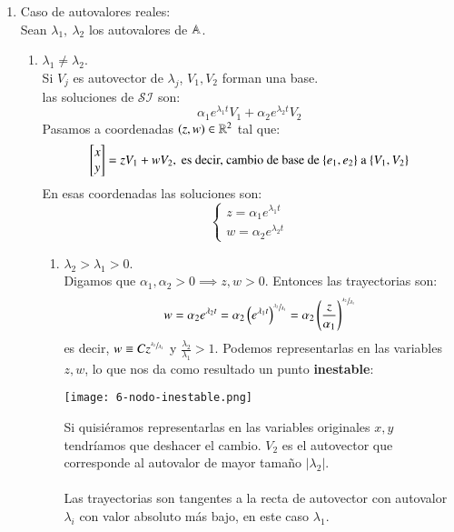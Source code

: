 \begin{enumerate}
    \item Caso de autovalores reales:\\
    Sean $\lambda_1,\ \lambda_2$ los autovalores de $\mathbb{A}$.
    \begin{enumerate}
        \item $\lambda_1 \neq \lambda_2$.\\
        Si $V_j$ es autovector de $\lambda_j$, $V_1, V_2$ forman una base.\\
        las soluciones de $\mathcal{SI}$ son:
        $$
            \alpha_1 e^{\lambda_1t}V_1 + \alpha_2 e^{\lambda_2t}V_2
        $$
        Pasamos a coordenadas $(z, w)\in\mathbb{R}^2$ tal que:
        $$
            \mx{x\\y} = z V_1 + wV_2, \text{ es decir, cambio de base de $\{e_1, e_2\}$ a $\{V_1, V_2\}$}
        $$
        En esas coordenadas las soluciones son:
        $$
            \begin{cases}
                z = \alpha_1 e^{\lambda_1 t}\\
                w = \alpha_2 e^{\lambda_2 t}
            \end{cases}
        $$
        \begin{enumerate}
            \item $\lambda_2 > \lambda_1 > 0$.\\
            Digamos que $\alpha_1, \alpha_2 > 0 \implies z, w > 0$. Entonces las trayectorias son:
            $$
                w = \alpha_2 e^{\lambda_2 t} = \alpha_2 \left(e^{\lambda_1 t }\right)^{\sfrac{\lambda_2}{\lambda_1}} = \alpha_2 \left(\frac{z}{\alpha_1}\right)^{\sfrac{\lambda_2}{\lambda_1}}
            $$ es decir, $w \equiv C z^{\sfrac{\lambda_2}{\lambda_1}}$ y $\frac{\lambda_2}{\lambda_1} > 1$. Podemos representarlas en las variables $z, w$, lo que nos da como resultado un punto \textbf{inestable}:\\
            \begin{center}
                \texttt{[image: 6-nodo-inestable.png]}
            \end{center}
            Si quisiéramos representarlas en las variables originales $x, y$ tendríamos que deshacer el cambio. $V_2$ es el autovector que corresponde al autovalor de mayor tamaño $|\lambda_2|$.\\\\
            Las trayectorias son tangentes a la recta de autovector con autovalor $\lambda_i$ con valor absoluto más bajo, en este caso $\lambda_1$.

\end{enumerate}
\end{enumerate}
\end{enumerate}
